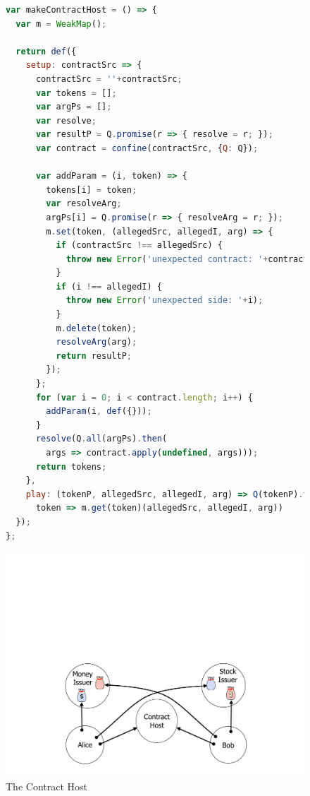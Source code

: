 \documentclass{llncs}
\begin{document}
\begin{figure}[htbp]
\begin{minipage}[t]{0.52\linewidth}
\begin{lstlisting}[language=javascript]
var makeContractHost = () => {
  var m = WeakMap();

  return def({
    setup: contractSrc => {
      contractSrc = ''+contractSrc;
      var tokens = [];
      var argPs = [];
      var resolve;
      var resultP = Q.promise(r => { resolve = r; });
      var contract = confine(contractSrc, {Q: Q});

      var addParam = (i, token) => {
        tokens[i] = token;
        var resolveArg;
        argPs[i] = Q.promise(r => { resolveArg = r; });
        m.set(token, (allegedSrc, allegedI, arg) => {
          if (contractSrc !== allegedSrc) {
            throw new Error('unexpected contract: '+contractSrc);
          }
          if (i !== allegedI) {
            throw new Error('unexpected side: '+i);
          }
          m.delete(token);
          resolveArg(arg);
          return resultP;
        });
      };
      for (var i = 0; i < contract.length; i++) {
        addParam(i, def({}));
      }
      resolve(Q.all(argPs).then(
        args => contract.apply(undefined, args)));
      return tokens;
    },
    play: (tokenP, allegedSrc, allegedI, arg) => Q(tokenP).then(
      token => m.get(token)(allegedSrc, allegedI, arg))
  });
};
\end{lstlisting}
\end{minipage}
\begin{minipage}[t]{0.48\linewidth}
\vspace{0pt}
\includegraphics[scale=0.26]{5players.pdf}
\end{minipage}
\caption{The Contract Host}
\label{makeContractHost}
\end{figure}
\end{document}
